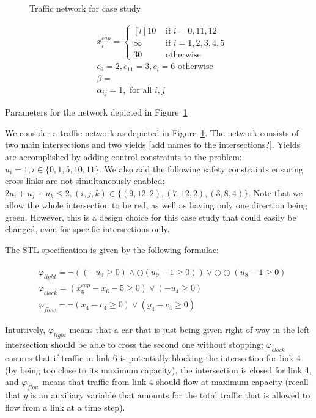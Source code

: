 \documentclass[12pt]{article}
\begin{document}
\begin{figure}
    \caption{Traffic network for case study}
    \label{fig:casestudy}
\end{figure}

\begin{table}
    \begin{align*}
        &x^{cap}_i = \left \{ \begin{matrix*}[l]
            10 & \text{ if } i = 0,11,12 \\
            \infty & \text{ if } i = 1,2,3,4,5 \\
            30 & \text{ otherwise }
        \end{matrix*} \right . \\
        &c_6 = 2, c_{11} = 3, c_i = 6 \text{ otherwise } \\
        &\beta = \\
        &\alpha_{ij} = 1, \text{ for all } i,j
    \end{align*}
    \caption{Parameters for the network depicted in Figure~\ref{fig:casestudy}}
    \label{tab:casestudy}
\end{table}

We consider a traffic network as depicted in Figure~\ref{fig:casestudy}. The network consists of two main intersections and two yields [add names to the intersections?]. Yields are accomplished by adding control constraints to the problem: $ u_i = 1, i \in \{0,1,5,10,11\} $. We also add the following safety constraints ensuring cross links are not simultaneously enabled: $ 2 u_i + u_j + u_k \leq 2, (i,j,k) \in \{ (9,12,2),(7,12,2),(3,8,4)\} $. Note that we allow the whole intersection to be red, as well as having only one direction being green. However, this is a design choice for this case study that could easily be changed, even for specific intersections only.

The STL specification is given by the following formulae:

\begin{gather}
    \begin{aligned}
        &\varphi_{light} = \lnot ((-u_9 \geq 0) \land \bigcirc (u_9 - 1 \geq 0)) \lor 
            \bigcirc \bigcirc (u_8 - 1 \geq 0) \\
        &\varphi_{block} = (x^{cap}_6 - x_6 - 5 \geq 0) \lor (-u_4 \geq 0) \\
        &\varphi_{flow} = \lnot (x_4 - c_4 \geq 0) \lor (y_4 - c_4 \geq 0)
    \end{aligned}
\end{gather}

Intuitively, $\varphi_{light}$ means that a car that is just being given right of way in the left intersection should be able to cross the second one without stopping; $\varphi_{block} $ ensures that if traffic in link 6 is potentially blocking the intersection for link 4 (by being too close to its maximum capacity), the intersection is closed for link 4, and $\varphi_{flow}$ means that traffic from link 4 should flow at maximum capacity (recall that $y$ is an auxiliary variable that amounts for the total traffic that is allowed to flow from a link at a time step).
\end{document}
